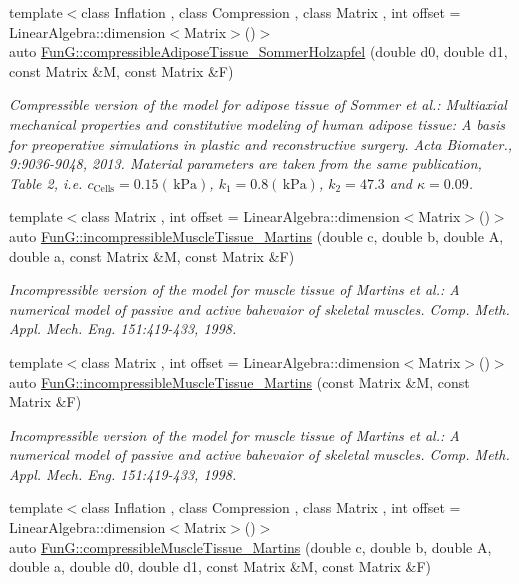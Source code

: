 \begin{DoxyCompactItemize}
{\footnotesize template$<$class Inflation , class Compression , class Matrix , int offset = Linear\-Algebra\-::dimension$<$\-Matrix$>$()$>$ }\\auto \hyperlink{group__Biomechanics_ga27bb3f7c579ce8c21a69ea4d4d0169d7}{Fun\-G\-::compressible\-Adipose\-Tissue\-\_\-\-Sommer\-Holzapfel} (double d0, double d1, const Matrix \&M, const Matrix \&F)
\begin{DoxyCompactList}\small\item\em Compressible version of the model for adipose tissue of Sommer et al.\-: Multiaxial mechanical properties and constitutive modeling of human adipose tissue\-: A basis for preoperative simulations in plastic and reconstructive surgery. Acta Biomater., 9\-:9036-\/9048, 2013. Material parameters are taken from the same publication, Table 2, i.\-e. $c_\mathrm{Cells}=0.15 (\,\mathrm{kPa})$, $k_1=0.8 (\,\mathrm{kPa})$, $k_2=47.3$ and $\kappa=0.09$. \end{DoxyCompactList}\item 
{\footnotesize template$<$class Matrix , int offset = Linear\-Algebra\-::dimension$<$\-Matrix$>$()$>$ }\\auto \hyperlink{group__Biomechanics_gafcc36a1958899ca9246c4c1b3c9bfd85}{Fun\-G\-::incompressible\-Muscle\-Tissue\-\_\-\-Martins} (double c, double b, double A, double a, const Matrix \&M, const Matrix \&F)
\begin{DoxyCompactList}\small\item\em Incompressible version of the model for muscle tissue of Martins et al.\-: A numerical model of passive and active bahevaior of skeletal muscles. Comp. Meth. Appl. Mech. Eng. 151\-:419-\/433, 1998. \end{DoxyCompactList}\item 
{\footnotesize template$<$class Matrix , int offset = Linear\-Algebra\-::dimension$<$\-Matrix$>$()$>$ }\\auto \hyperlink{group__Biomechanics_ga9e414585a90b1988e9fa88d17d875055}{Fun\-G\-::incompressible\-Muscle\-Tissue\-\_\-\-Martins} (const Matrix \&M, const Matrix \&F)
\begin{DoxyCompactList}\small\item\em Incompressible version of the model for muscle tissue of Martins et al.\-: A numerical model of passive and active bahevaior of skeletal muscles. Comp. Meth. Appl. Mech. Eng. 151\-:419-\/433, 1998. \end{DoxyCompactList}\item 
{\footnotesize template$<$class Inflation , class Compression , class Matrix , int offset = Linear\-Algebra\-::dimension$<$\-Matrix$>$()$>$ }\\auto \hyperlink{group__Biomechanics_gad831914c493a3da04ed40c3c0ce87a62}{Fun\-G\-::compressible\-Muscle\-Tissue\-\_\-\-Martins} (double c, double b, double A, double a, double d0, double d1, const Matrix \&M, const Matrix \&F)

\end{DoxyCompactItemize}

